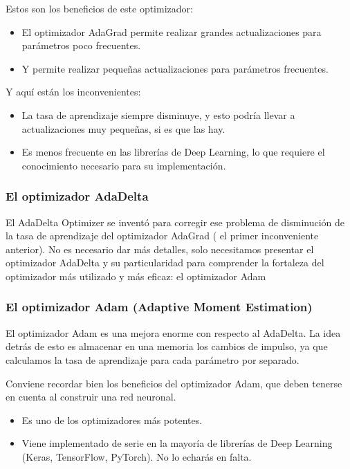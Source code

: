 \documentclass[
]{book}
\providecommand{\tightlist}{%
  \setlength{\itemsep}{0pt}\setlength{\parskip}{0pt}}
\begin{document}
Estos son los beneficios de este optimizador:

\begin{itemize}
\tightlist
\item
  El optimizador AdaGrad permite realizar grandes actualizaciones para parámetros poco frecuentes.
\item
  Y permite realizar pequeñas actualizaciones para parámetros frecuentes.
\end{itemize}

Y aquí están los inconvenientes:

\begin{itemize}
\tightlist
\item
  La tasa de aprendizaje siempre disminuye, y esto podría llevar a actualizaciones muy pequeñas, si es que las hay.
\item
  Es menos frecuente en las librerías de Deep Learning, lo que requiere el conocimiento necesario para su implementación.
\end{itemize}

\hypertarget{el-optimizador-adadelta}{%
\subsubsection{El optimizador AdaDelta}\label{el-optimizador-adadelta}}

El AdaDelta Optimizer se inventó para corregir ese problema de disminución de la tasa de aprendizaje del optimizador AdaGrad ( el primer inconveniente anterior). No es necesario dar más detalles, solo necesitamos presentar el optimizador AdaDelta y su particularidad para comprender la fortaleza del optimizador más utilizado y más eficaz: el optimizador Adam

\hypertarget{el-optimizador-adam-adaptive-moment-estimation}{%
\subsubsection{El optimizador Adam (Adaptive Moment Estimation)}\label{el-optimizador-adam-adaptive-moment-estimation}}

El optimizador Adam es una mejora enorme con respecto al AdaDelta. La idea detrás de esto es almacenar en una memoria los cambios de impulso, ya que calculamos la tasa de aprendizaje para cada parámetro por separado.

Conviene recordar bien los beneficios del optimizador Adam, que deben tenerse en cuenta al construir una red neuronal.

\begin{itemize}
\tightlist
\item
  Es uno de los optimizadores más potentes.
\item
  Viene implementado de serie en la mayoría de librerías de Deep Learning (Keras, TensorFlow, PyTorch). No lo echarás en falta.
\end{itemize}
\end{document}
